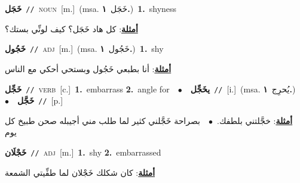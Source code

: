 \documentclass[10pt,a4paper,twoside]{article} %
\begin{document}
\begin{multicols}{2}
{{{{{{{\setlength\topsep{0pt}\textbf{\foreignlanguage{arabic}{خَجَل}}\ {\color{gray}\texttt{//}\color{black}}\ \textsc{noun}\ [m.]\ \color{gray}(msa. \foreignlanguage{arabic}{خَجَل}~\foreignlanguage{arabic}{\textbf{١.}})\color{black}\ \textbf{1.}~shyness\  \begin{flushright}\color{gray}\foreignlanguage{arabic}{\textbf{\underline{\foreignlanguage{arabic}{أمثلة}}}: كل هاد خَجَل؟ كيف لونِّي بستك؟}\end{flushright}\color{black}} \vspace{2mm}

{\setlength\topsep{0pt}\textbf{\foreignlanguage{arabic}{خَجُول}}\ {\color{gray}\texttt{//}\color{black}}\ \textsc{adj}\ [m.]\ \color{gray}(msa. \foreignlanguage{arabic}{خَجُول}~\foreignlanguage{arabic}{\textbf{١.}})\color{black}\ \textbf{1.}~shy\  \begin{flushright}\color{gray}\foreignlanguage{arabic}{\textbf{\underline{\foreignlanguage{arabic}{أمثلة}}}: أنا بطبعي خَجُول وبستحي أحكي مع الناس}\end{flushright}\color{black}} \vspace{2mm}

{\setlength\topsep{0pt}\textbf{\foreignlanguage{arabic}{خَجِّل}}\ {\color{gray}\texttt{//}\color{black}}\ \textsc{verb}\ [c.]\ \textbf{1.}~embarrass  \textbf{2.}~angle for\ \ $\bullet$\ \ \setlength\topsep{0pt}\textbf{\foreignlanguage{arabic}{يخَجِّل}}\ {\color{gray}\texttt{//}\color{black}}\ [i.]\ \color{gray}(msa. \foreignlanguage{arabic}{يُحرِج}~\foreignlanguage{arabic}{\textbf{١.}})\color{black}\ \ $\bullet$\ \ \setlength\topsep{0pt}\textbf{\foreignlanguage{arabic}{خَجَّل}}\ {\color{gray}\texttt{//}\color{black}}\ [p.]\  \begin{flushright}\color{gray}\foreignlanguage{arabic}{\textbf{\underline{\foreignlanguage{arabic}{أمثلة}}}: خجَّلتني بلطفك.\ $\bullet$\ \  بصراحة خَجَّلني كثير لما طلب مني أجيبله صحن طبيخ كل يوم}\end{flushright}\color{black}} \vspace{2mm}

{\setlength\topsep{0pt}\textbf{\foreignlanguage{arabic}{خَجْلَان}}\ {\color{gray}\texttt{//}\color{black}}\ \textsc{adj}\ [m.]\ \textbf{1.}~shy  \textbf{2.}~embarrassed\  \begin{flushright}\color{gray}\foreignlanguage{arabic}{\textbf{\underline{\foreignlanguage{arabic}{أمثلة}}}: كان شكلك خَجْلان لما طفِّيتي الشمعة}\end{flushright}\color{black}} \vspace{2mm}

}}}}}}
\end{multicols}
\end{document}
